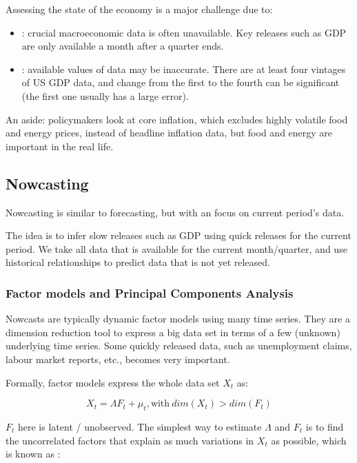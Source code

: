         Assessing the state of the economy is a major challenge due to:
        \begin{itemize}
            \item {}: crucial macroeconomic data is often unavailable. Key releases such as GDP are only available a month after a quarter ends.
            \item {}: available values of data may be inaccurate. There are at least four vintages of US GDP data, and change from the first to the fourth can be significant (the first one usually has a large error).
        \end{itemize}
        
        An aside: policymakers look at core inflation, which excludes highly volatile food and energy prices, instead of headline inflation data, but food and energy are important in the real life.
        
    \subsection{Nowcasting}

        Nowcasting is similar to forecasting, but with an focus on current period's data. 
        
        The idea is to infer slow releases such as GDP using quick releases for the current period. We take all data that is available for the current month/quarter, and use historical relationships to predict data that is not yet released.

        \subsubsection{Factor models and Principal Components Analysis}

            Nowcasts are typically dynamic factor models using many time series. They are a dimension reduction tool to express a big data set in terms of a few (unknown) underlying time series. Some quickly released data, such as unemployment claims, labour market reports, etc., becomes very important.

            Formally, factor models express the whole data set $X_t$ as:
            
            $$X_t = \Lambda F_t + \mu_t, \text{with}\ dim(X_t) > dim(F_t)$$

            $F_t$ here is latent / unobserved. The simplest way to estimate $\Lambda$ and $F_t$ is to find the uncorrelated factors that explain as much variations in $X_t$ as possible, which is known as :

